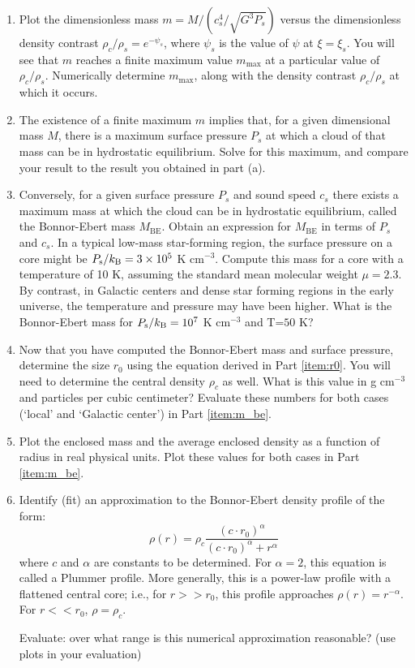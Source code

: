 \documentclass[twoside]{tufte-book} %
\begin{document}
\begin{enumerate}
\item Plot the dimensionless mass $m = M/(c_s^4/\sqrt{G^3 P_s})$ versus the dimensionless density contrast $\rho_c/\rho_s=e^{-\psi_s}$, where $\psi_s$ is the value of $\psi$ at $\xi=\xi_s$. You will see that $m$ reaches a finite maximum value $m_{\mathrm{max}}$ at a particular value of $\rho_c/\rho_s$. Numerically determine $m_{\mathrm{max}}$, along with the density contrast $\rho_c/\rho_s$ at which it occurs.
\item The existence of a finite maximum $m$ implies that, for a given dimensional mass $M$, there is a maximum surface pressure $P_s$ at which a cloud of that mass can be in hydrostatic equilibrium. Solve for this maximum, and compare your result to the result you obtained in part (a).
\item Conversely, for a given surface pressure $P_s$ and sound speed $c_s$ there exists a maximum mass at which the cloud can be in hydrostatic equilibrium, called the Bonnor-Ebert mass $M_{\mathrm{BE}}$. Obtain an expression for $M_{\mathrm{BE}}$ in terms of $P_s$ and $c_s$. In a typical low-mass star-forming region, the surface pressure on a core might be $P_{\mathrm{s}}/k_{\rm B} = 3\times 10^5$ K cm$^{-3}$. Compute this mass for a core with a temperature of 10 K, assuming the standard mean molecular weight $\mu=2.3$.\\
    By contrast, in Galactic centers and dense star forming regions in the early universe, the temperature and pressure may have been higher.  What is the Bonnor-Ebert mass for $P_{\mathrm{s}}/k_{\rm B} = 10^7$ K cm$^{-3}$ and T=$50$ K?
    \label{item:m_be}


\item Now that you have computed the Bonnor-Ebert mass and surface pressure, determine the size $r_0$ using the equation derived in Part \ref{item:r0}.
    You will need to determine the central density $\rho_c$ as well.  What is this value in g cm$^{-3}$ and particles per cubic centimeter?
    Evaluate these numbers for both cases (`local' and `Galactic center') in Part \ref{item:m_be}.

\item Plot the enclosed mass and the average enclosed density as a function of radius in real physical units.
    Plot these values for both cases in Part \ref{item:m_be}.

\item Identify (fit) an approximation to the Bonnor-Ebert density profile of the form:
    \begin{displaymath}
        \rho(r) = \rho_c \frac{(c \cdot r_0)^\alpha}{(c \cdot r_0)^\alpha + r^\alpha}
    \end{displaymath}
    where $c$ and $\alpha$ are constants to be determined.  
    For $\alpha=2$, this equation is called a Plummer profile.  More generally, this
    is a power-law profile with a flattened central core; i.e., for $r>>r_0$, this
    profile approaches $\rho(r) = r^{-\alpha}$.  For $r<<r_0$, $\rho=\rho_c$.

    

    Evaluate: over what range is this numerical approximation reasonable?
    (use plots in your evaluation)
\end{enumerate}
\end{document}
